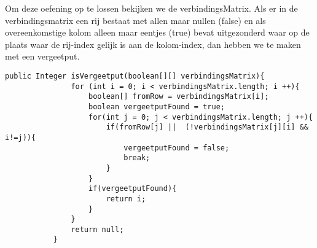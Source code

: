 \begin{Oplossing}{10.8}
Om deze oefening op te lossen bekijken we de verbindingsMatrix. Als er in de verbindingsmatrix een rij bestaat met allen maar nullen (false) en als overeenkomstige kolom alleen maar eentjes (true) bevat uitgezonderd waar op de plaats waar de rij-index gelijk is aan de kolom-index, dan hebben we te maken met een vergeetput.
     \begin{lstlisting}[caption={isVergeetput(verbindingsMatrix) methode}, label=bstaddnode]
          public Integer isVergeetput(boolean[][] verbindingsMatrix){
               for (int i = 0; i < verbindingsMatrix.length; i ++){
                   boolean[] fromRow = verbindingsMatrix[i];
                   boolean vergeetputFound = true;
                   for(int j = 0; j < verbindingsMatrix.length; j ++){
                       if(fromRow[j] ||  (!verbindingsMatrix[j][i] && i!=j)){
                           vergeetputFound = false;
                           break;
                       }
                   }
                   if(vergeetputFound){
                       return i;
                   }
               }
               return null;
           }
          \end{lstlisting}

\end{Oplossing}
